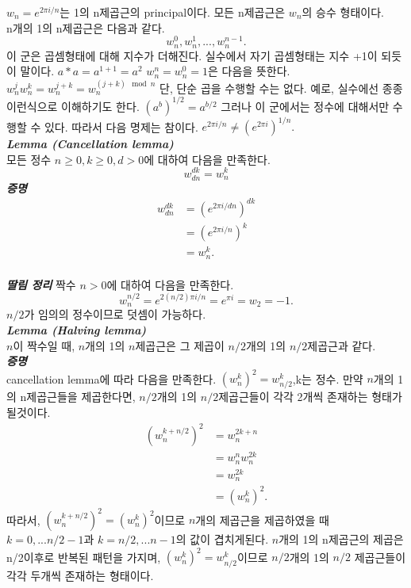 \documentclass{article}
\begin{document}
$w_n = e^{2 \pi i/n}$는 1의 n제곱근의 principal이다. 모든 n제곱근은 $w_n$의 승수 형태이다. 
\\
n개의 1의 n제곱근은 다음과 같다. 
$$
w_n^0, w_n^1, ... , w_n^{n-1}.
$$
이 군은 곱셈형태에 대해 지수가 더해진다. 실수에서 자기 곱셈형태는 지수 +1이 되듯이 말이다. $a*a = a^{1+1}=a^2$
$w_n^n = w_n^0 = 1$은 다음을 뜻한다. $w_n^j w_n^k = w_n^{j+k} = w_n^{(j+k)\mod{n}}$
단, 단순 곱을 수행할 수는 없다. 예로, 실수에선 종종 이런식으로 이해하기도 한다. $(a^{b})^{1/2} = a^{b/2}$
그러나 이 군에서는 정수에 대해서만 수행할 수 있다. 따라서 다음 명제는 참이다. $e^{2 \pi i/n} \ne (e^{2 \pi i})^{1/n}.$
\vspace{5mm}
\\
\textbf{\textit{Lemma (Cancellation lemma)}}
\\
모든 정수 $n \ge 0, k \ge 0, d > 0$에 대하여 다음을 만족한다. 
$$w_{dn}^{dk} = w_n^k$$
\vspace{5mm}
\textbf{\textit{증명}}
\begin{align*}
    w_{dn}^{dk} &= (e^{2 \pi i/dn})^{dk}\\
    &=(e^{2 \pi i/n})^k\\
    &= w_n^k.
\end{align*}
\vspace{5mm}
\\
\textbf{\textit{딸림 정리}} 짝수 $n > 0$에 대하여 다음을 만족한다. 
$$
w_n^{n/2} = e^{2 (n/2) \pi i / n} = e^{\pi i} =  w_2 = -1.
$$
$n/2$가 임의의 정수이므로 덧셈이 가능하다. 
\vspace{5mm}
\\
\textbf{\textit{Lemma (Halving lemma)}}
\\
$n$이 짝수일 때, $n$개의 1의 $n$제곱근은 그 제곱이 $n/2$개의 1의 $n/2$제곱근과 같다. 
\vspace{5mm}
\\
\textbf{\textit{증명}}
\\
cancellation lemma에 따라 다음을 만족한다. $(w_n^k)^2 = w_{n/2}^k$,k는 정수. 
만약 $n$개의 1의 n제곱근들을 제곱한다면, $n/2$개의 1의 $n/2$제곱근들이 각각 2개씩 존재하는 형태가 될것이다. 
\begin{align*}
    (w_n^{k+n/2})^2 &= w_n^{2k+n}\\
    &=w_n^n w_n^{2k}\\
    &=w_n^{2k}\\
    &=(w_n^k)^2.
\end{align*}
따라서, $(w_n^{k+n/2})^2 = (w_n^k)^2$이므로 $n$개의 제곱근을 제곱하였을 때 $k=0, ... n/2-1$과 $k=n/2, ... n-1$의 값이 겹치게된다. 
$n$개의 1의 n제곱근의 제곱은 n/2이후로 반복된 패턴을 가지며, $(w_n^k)^2 = w_{n/2}^k$이므로 $n/2$개의 1의 $n/2$ 제곱근들이 각각 두개씩 존재하는 형태이다. 
\end{document}
